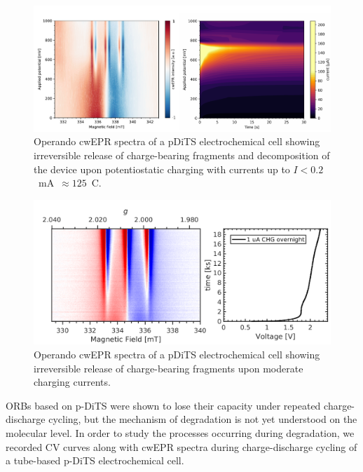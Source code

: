 \begin{figure}[!h]
\center
	\includegraphics[width=1\textwidth]{./operando_epr/figures/degradation/overnight_dits_201211_full_redox_contour_XY.pdf}
	\caption{Operando cwEPR spectra of a pDiTS electrochemical cell showing irreversible release of charge-bearing fragments and decomposition of the device upon potentiostatic charging with currents up to $I<0.2$~mA~$\approx125$~C.}
	\label{fig:operando_degradation_device}
\end{figure}


\begin{figure}[!h]
\center
	\includegraphics[width=1\textwidth]{./operando_epr/figures/degradation/pDiTS_slow_charge_MS5000_forslides.png}
	\caption{Operando cwEPR spectra of a pDiTS electrochemical cell showing irreversible release of charge-bearing fragments upon moderate charging currents.}
	\label{fig:operando_degradation_3_lines_release}
\end{figure}



\par
ORBs based on p-DiTS were shown to lose their capacity under repeated charge-discharge cycling,\cite{vereshchagin2020_battandsupercaps} but the mechanism of degradation is not yet understood on the molecular level. In order to study the processes occurring during degradation, we recorded CV curves along with cwEPR spectra during charge-discharge cycling of a tube-based p-DiTS electrochemical cell.

